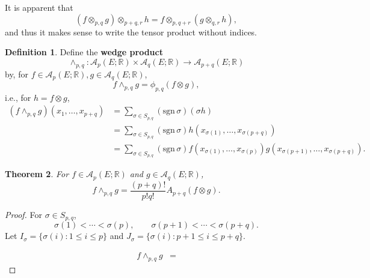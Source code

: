 \documentclass{article}
\newcommand{\sgn}{\mathrm{sgn}\,}
\newtheorem{theorem}{Theorem}
\theoremstyle{definition}
\newtheorem{definition}[theorem]{Definition}
\begin{document}
It is apparent that
\[
(f \otimes_{p,q} g) \otimes_{p+q,r} h 
=f \otimes_{p,q+r} (g \otimes_{q,r} h),
\]
and thus it makes sense to write the tensor product without indices.

\begin{definition}
Define the \textbf{wedge product} 
\[
\wedge_{p,q}:\mathscr{A}_p(E;\mathbb{R}) \times \mathscr{A}_q(E;\mathbb{R}) \to 
\mathscr{A}_{p+q}(E;\mathbb{R})
\]
by, for $f \in \mathscr{A}_p(E;\mathbb{R}), g \in \mathscr{A}_q(E;\mathbb{R})$,
\[
f \wedge_{p,q} g = \phi_{p,q}(f \otimes g),
\]
i.e., for $h = f \otimes g$,
\begin{align*}
(f \wedge_{p,q} g)(x_1,\ldots,x_{p+q}) &= 
\sum_{\sigma \in S_{p,q}} (\sgn \sigma) (\sigma h)\\
&=\sum_{\sigma \in S_{p,q}} (\sgn \sigma) h(x_{\sigma(1)},\ldots,x_{\sigma(p+q)})\\
&=\sum_{\sigma \in S_{p,q}} (\sgn \sigma) f(x_{\sigma(1)},\ldots,x_{\sigma(p)}) g(x_{\sigma(p+1)},\ldots,x_{\sigma(p+q)}).
\end{align*}
\end{definition}


\begin{theorem}
For $f \in \mathscr{A}_p(E;\mathbb{R})$ and $g \in \mathscr{A}_q(E;\mathbb{R})$,
\[
f \wedge_{p,q} g = \frac{(p+q)!}{p!q!} A_{p+q}(f \otimes g).
\]
\end{theorem}
\begin{proof}
For $\sigma \in S_{p,q}$,
\[
\sigma(1)<\cdots<\sigma(p),\qquad \sigma(p+1)<\cdots<\sigma(p+q).
\]
Let $I_\sigma=\{\sigma(i): 1 \leq i \leq p\}$ and $J_\sigma = 
\{\sigma(i): p+1 \leq i \leq p+q\}$. 

\begin{align*}
f \wedge_{p,q} g&=
\end{align*}
\end{proof}
\end{document}
